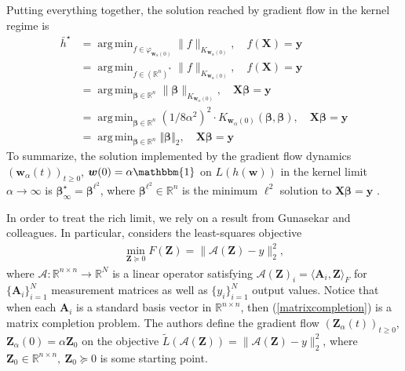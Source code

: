 \documentclass{article}
\DeclareMathOperator*{\argmin}{arg\,min}
\begin{document}
Putting everything together, the solution reached by gradient flow in the kernel regime is
\begin{align*}
    \bar{h}^{\star} &= \argmin_{f \in \varphi_{\boldsymbol{w}_{\alpha}(0)}} \| f \|_{K_{\boldsymbol{w}_{\alpha}(0)}},\quad f(\boldsymbol{X}) = \boldsymbol{y}\\
    &= \argmin_{f \in (\mathbb{R}^n)^*} \| f \|_{K_{\boldsymbol{w}_{\alpha}(0)}},\quad f(\boldsymbol{X}) = \boldsymbol{y}\\
    &= \argmin_{\boldsymbol{\beta} \in \mathbb{R}^n} \| \boldsymbol{\beta} \|_{K_{\boldsymbol{w}_{\alpha}(0)} },\quad \boldsymbol{X}\boldsymbol{\beta} = \boldsymbol{y}\\
    &= \argmin_{\boldsymbol{\beta} \in \mathbb{R}^n} (1/8\alpha^2)^2\cdot K_{\boldsymbol{w}_{\alpha}(0)}(\boldsymbol{\beta},\boldsymbol{\beta}), \quad \boldsymbol{X}\boldsymbol{\beta} = \boldsymbol{y}\\
    &= \argmin_{\boldsymbol{\beta} \in \mathbb{R}^n} \Vert \boldsymbol{\beta} \Vert_2, \quad \boldsymbol{X}\boldsymbol{\beta} = \boldsymbol{y}
\end{align*}
To summarize, the solution implemented by the gradient flow dynamics $(\boldsymbol{w}_{\alpha}(t))_{t \geq 0}$, $\boldsymbol{w}(0) = \alpha \mathbbm{1}$ on $L(h(\boldsymbol{w}))$ in the kernel limit $\alpha \rightarrow \infty$ is $\boldsymbol{\beta}_{\infty}^{\star} = \boldsymbol{\beta}^{\ell^2}$, where $\boldsymbol{\beta}^{\ell^2} \in \mathbb{R}^n$ is the minimum $\ell^2$ solution to $\boldsymbol{X} \boldsymbol{\beta} = \boldsymbol{y}$ \cite{woodworth2020kernel}.

In order to treat the rich limit, we rely on a result from Gunasekar and colleagues. In particular, \cite{gunasekar2018implicit} considers the least-squares objective
\begin{align}\label{matrixcompletion}
    \min_{\boldsymbol{Z} \succeq 0} F(\boldsymbol{Z}) = \| \mathcal{A}(\boldsymbol{Z}) - y \|_2^2,
\end{align}
where $\mathcal{A}: \mathbb{R}^{n \times n} \rightarrow \mathbb{R}^N$ is a linear operator satisfying $\mathcal{A}(\boldsymbol{Z})_i = \langle \boldsymbol{A}_i, \boldsymbol{Z} \rangle_F$ for $\{ \boldsymbol{A}_i \}_{i=1}^N$ measurement matrices as well as $\{ y_i \}_{i=1}^N$ output values. Notice that when each $\boldsymbol{A}_i$ is a standard basis vector in $\mathbb{R}^{n \times n}$, then (\ref{matrixcompletion}) is a matrix completion problem. The authors define the gradient flow $(\boldsymbol{Z}_{\alpha}(t))_{t \geq 0}$, $\boldsymbol{Z}_{\alpha}(0) = \alpha \boldsymbol{Z}_0$ on the objective $\tilde{L}(\mathcal{A}(\boldsymbol{Z})) = \| \mathcal{A}(\boldsymbol{Z}) - y \|_2^2$, where $\boldsymbol{Z}_0 \in \mathbb{R}^{n \times n}, \ \boldsymbol{Z}_0 \succeq 0$ is some starting point. 
\end{document}
